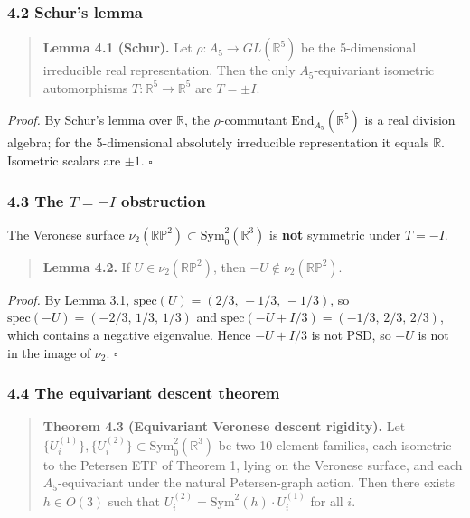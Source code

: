 \documentclass[
]{article}
\begin{document}
\subsubsection{4.2 Schur's lemma}\label{schurs-lemma}

\begin{quote}
\textbf{Lemma 4.1 (Schur).} Let \(\rho : A_5 \to GL(\mathbb{R}^5)\) be
the 5-dimensional irreducible real representation. Then the only
\(A_5\)-equivariant isometric automorphisms
\(T : \mathbb{R}^5 \to \mathbb{R}^5\) are \(T = \pm I\).
\end{quote}

\emph{Proof.} By Schur's lemma over \(\mathbb{R}\), the
\(\rho\)-commutant \(\mathrm{End}_{A_5}(\mathbb{R}^5)\) is a real
division algebra; for the 5-dimensional absolutely irreducible
representation it equals \(\mathbb{R}\). Isometric scalars are
\(\pm 1\). \(\square\)

\subsubsection{\texorpdfstring{4.3 The \(T = -I\)
obstruction}{4.3 The T = -I obstruction}}\label{the-t--i-obstruction}

The Veronese surface
\(\nu_2(\mathbb{RP}^2) \subset \mathrm{Sym}^2_0(\mathbb{R}^3)\) is
\textbf{not} symmetric under \(T = -I\).

\begin{quote}
\textbf{Lemma 4.2.} If \(U \in \nu_2(\mathbb{RP}^2)\), then \(-U \notin
\nu_2(\mathbb{RP}^2)\).
\end{quote}

\emph{Proof.} By Lemma 3.1, \(\mathrm{spec}(U) = (2/3,\,-1/3,\,-1/3)\),
so \(\mathrm{spec}(-U) = (-2/3,\,1/3,\,1/3)\) and
\(\mathrm{spec}(-U + I/3) = (-1/3,\,2/3,\,2/3)\), which contains a
negative eigenvalue. Hence \(-U + I/3\) is not PSD, so \(-U\) is not in
the image of \(\nu_2\). \(\square\)

\subsubsection{4.4 The equivariant descent
theorem}\label{the-equivariant-descent-theorem-1}

\begin{quote}
\textbf{Theorem 4.3 (Equivariant Veronese descent rigidity).} Let
\(\{U_i^{(1)}\}, \{U_i^{(2)}\} \subset \mathrm{Sym}^2_0(\mathbb{R}^3)\)
be two 10-element families, each isometric to the Petersen ETF of
Theorem 1, lying on the Veronese surface, and each \(A_5\)-equivariant
under the natural Petersen-graph action. Then there exists
\(h \in O(3)\) such that
\(U_i^{(2)} = \mathrm{Sym}^2(h)\cdot U_i^{(1)}\) for all \(i\).
\end{quote}
\end{document}
